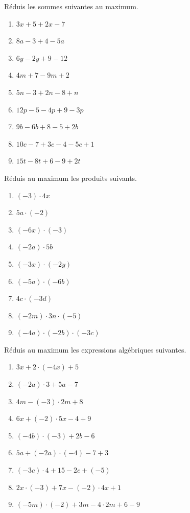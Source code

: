 \documentclass[../../syllabus_1.tex]{subfiles}
\begin{document}
\begin{exercise}
    Réduis les sommes suivantes au maximum.
    \begin{enumerate}[cols=3]
        \item \(3x+5+2x-7 \)
        \item \(8a-3+4-5a \)
        \item \(6y-2y+9-12 \)
        \item \(4m+7-9m+2 \)
        \item \(5n-3+2n-8+n \)
        \item \(12p-5-4p+9-3p \)
        \item \(9b-6b+8-5+2b \)
        \item \(10c-7+3c-4-5c+1 \)
        \item \(15t-8t+6-9+2t \)
    \end{enumerate}
\end{exercise}

\begin{exercise}
    Réduis au maximum les produits suivants.
    \begin{enumerate}[cols=3]
        \item \((-3) \cdot 4x \)
        \item \(5a \cdot (-2) \)
        \item \((-6x) \cdot (-3) \)
        \item \((-2a) \cdot 5b \)
        \item \((-3x) \cdot (-2y) \)
        \item \((-5a) \cdot (-6b) \)
        \item \(4c \cdot (-3d) \)
        \item \((-2m) \cdot 3n \cdot (-5) \)
        \item \((-4a) \cdot (-2b) \cdot (-3c) \)
    \end{enumerate}
\end{exercise}

\begin{exercise}
    Réduis au maximum les expressions algébriques suivantes.
    \begin{enumerate}[cols=2]
        \item \(3x+2 \cdot (-4x)+5 \)
        \item \((-2a) \cdot 3+5a-7 \)
        \item \(4m-(-3) \cdot 2m+8 \)
        \item \(6x+(-2) \cdot 5x-4+9 \)
        \item \((-4b) \cdot (-3)+2b-6 \)
        \item \(5a+(-2a) \cdot (-4)-7+3 \)
        \item \((-3c) \cdot 4+15-2c+(-5) \)
        \item \(2x \cdot (-3)+7x-(-2) \cdot 4x+1 \)
        \item \((-5m) \cdot (-2)+3m-4 \cdot 2m+6-9 \)
    \end{enumerate}
\end{exercise}
\end{document}
